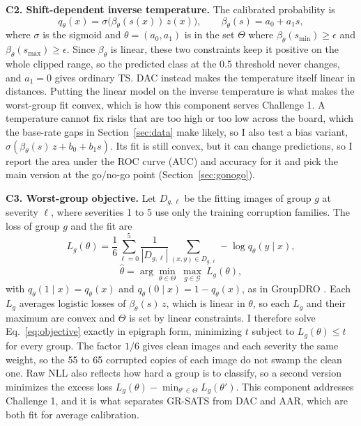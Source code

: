 \documentclass[sigconf,nonacm]{acmart}
\begin{document}
\textbf{C2. Shift-dependent inverse temperature.} The calibrated probability is
\begin{equation}
  q_\theta(x) = \sigma\big(\beta_\theta(s(x))\, z(x)\big), \qquad \beta_\theta(s) = a_0 + a_1 s,
  \label{eq:calib}
\end{equation}
where $\sigma$ is the sigmoid and $\theta = (a_0, a_1)$ is in the set $\Theta$ where $\beta_\theta(s_{\min}) \geq \epsilon$ and $\beta_\theta(s_{\max}) \geq \epsilon$. Since $\beta_\theta$ is linear, these two constraints keep it positive on the whole clipped range, so the predicted class at the 0.5 threshold never changes, and $a_1 = 0$ gives ordinary TS. DAC instead makes the temperature itself linear in distances. Putting the linear model on the inverse temperature is what makes the worst-group fit convex, which is how this component serves Challenge 1. A temperature cannot fix risks that are too high or too low across the board, which the base-rate gaps in Section~\ref{sec:data} make likely, so I also test a bias variant, $\sigma(\beta_\theta(s)\, z + b_0 + b_1 s)$. Its fit is still convex, but it can change predictions, so I report the area under the ROC curve (AUC) and accuracy for it and pick the main version at the go/no-go point (Section~\ref{sec:gonogo}).

\textbf{C3. Worst-group objective.} Let $D_{g,\ell}$ be the fitting images of group $g$ at severity $\ell$, where severities 1 to 5 use only the training corruption families. The loss of group $g$ and the fit are
\begin{equation}
  L_g(\theta) = \frac{1}{6}\sum_{\ell=0}^{5}\frac{1}{|D_{g,\ell}|}\sum_{(x,y)\in D_{g,\ell}} -\log q_\theta(y \mid x),
  \label{eq:grouploss}
\end{equation}
\begin{equation}
  \hat{\theta} = \arg\min_{\theta \in \Theta}\ \max_{g \in \mathcal{G}}\ L_g(\theta),
  \label{eq:objective}
\end{equation}
with $q_\theta(1 \mid x) = q_\theta(x)$ and $q_\theta(0 \mid x) = 1 - q_\theta(x)$, as in GroupDRO \cite{sagawa2020groupdro}. Each $L_g$ averages logistic losses of $\beta_\theta(s)\, z$, which is linear in $\theta$, so each $L_g$ and their maximum are convex and $\Theta$ is set by linear constraints. I therefore solve Eq.~\eqref{eq:objective} exactly in epigraph form, minimizing $t$ subject to $L_g(\theta) \leq t$ for every group. The factor $1/6$ gives clean images and each severity the same weight, so the 55 to 65 corrupted copies of each image do not swamp the clean one. Raw NLL also reflects how hard a group is to classify, so a second version minimizes the excess loss $L_g(\theta) - \min_{\theta' \in \Theta} L_g(\theta')$. This component addresses Challenge 1, and it is what separates GR-SATS from DAC and AAR, which are both fit for average calibration.
\end{document}
